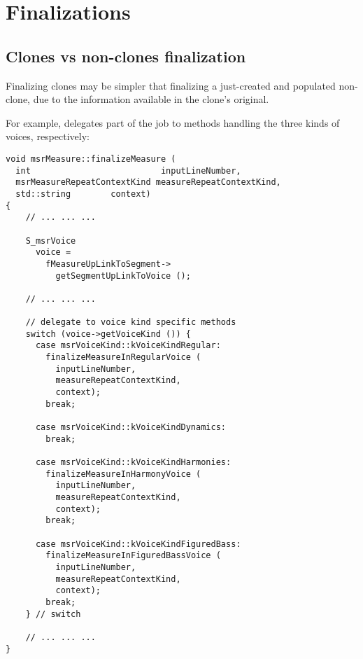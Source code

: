 



\chapter{Finalizations}

\section{Clones vs non-clones finalization}

Finalizing clones may be simpler that finalizing a just-created and populated non-clone, due to the information available in the clone's original.

For example,  delegates part of the job to methods handling the three kinds of voices, respectively:
\begin{lstlisting}[language=CPlusPlus]
void msrMeasure::finalizeMeasure (
  int                          inputLineNumber,
  msrMeasureRepeatContextKind measureRepeatContextKind,
  std::string        context)
{
	// ... ... ...

    S_msrVoice
      voice =
        fMeasureUpLinkToSegment->
          getSegmentUpLinkToVoice ();

	// ... ... ...

    // delegate to voice kind specific methods
    switch (voice->getVoiceKind ()) {
      case msrVoiceKind::kVoiceKindRegular:
        finalizeMeasureInRegularVoice (
          inputLineNumber,
          measureRepeatContextKind,
          context);
        break;

      case msrVoiceKind::kVoiceKindDynamics:
        break;

      case msrVoiceKind::kVoiceKindHarmonies:
        finalizeMeasureInHarmonyVoice (
          inputLineNumber,
          measureRepeatContextKind,
          context);
        break;

      case msrVoiceKind::kVoiceKindFiguredBass:
        finalizeMeasureInFiguredBassVoice (
          inputLineNumber,
          measureRepeatContextKind,
          context);
        break;
    } // switch

	// ... ... ...
}
\end{lstlisting}

